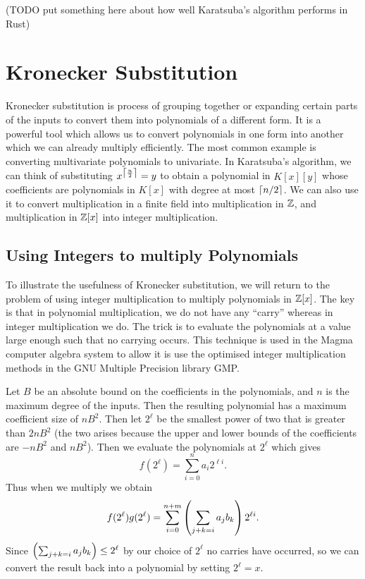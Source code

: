 (TODO put something here about how well Karatsuba's algorithm performs in Rust)

\section{Kronecker Substitution}%
\label{sub:kronecker_substitution}

Kronecker substitution is process of grouping together or expanding certain parts of the inputs to convert them into polynomials of a different form. It is a powerful tool which allows us to convert polynomials in one form into another which we can already multiply efficiently. The most common example is converting multivariate polynomials to univariate. In Karatsuba's algorithm, we can think of substituting $x^{\left \lceil \frac{n}{2} \right \rceil} = y$ to obtain a polynomial in $K[x][y]$ whose coefficients are polynomials in $K[x]$ with degree at most $\left \lceil n/2 \right \rceil$. We can also use it to convert multiplication in a finite field into multiplication in ${\mathbb Z}$, and multiplication in ${\mathbb Z}[x]$ into integer multiplication.

\subsection{Using Integers to multiply Polynomials}%
\label{sub:Using Integers to multiply Polynomials}

To illustrate the usefulness of Kronecker substitution, we will return to the problem of using integer multiplication to multiply polynomials in ${\mathbb Z}[x]$. The key is that in polynomial multiplication, we do not have any ``carry'' whereas in integer multiplication we do. The trick is to evaluate the polynomials at a value large enough such that no carrying occurs. This technique is used in the Magma computer algebra system to allow it is use the optimised integer multiplication methods in the GNU Multiple Precision library GMP.

Let $B$ be an absolute bound on the coefficients in the polynomials, and $n$ is the maximum degree of the inputs. Then the resulting polynomial has a maximum coefficient size of $nB^2$. Then let $2^\ell$ be the smallest power of two that is greater than $2nB^2$ (the two arises because the upper and lower bounds of the coefficients are $-nB^2$ and $nB^2$). Then we evaluate the polynomials at $2^\ell$ which gives
\[
    f(2^\ell) = \sum^n_{i = 0} a_i 2^{\ell i}.
\]
Thus when we multiply we obtain
\[
    f(2^\ell)g(2^\ell) = \sum^{n+m}_{i=0} \left(\sum_{j + k = i} a_jb_k\right)2^{\ell i}.
\]
Since $\left(\sum_{j + k = i}a_j b_k\right) \leq 2^{\ell}$ by our choice of $2^\ell$ no carries have occurred, so we can convert the result back into a polynomial by setting $2^\ell = x$.

